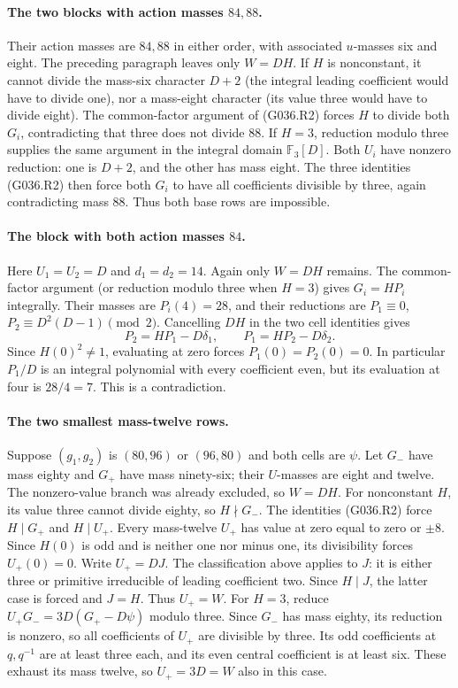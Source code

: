 \paragraph{The two blocks with action masses $84,88$.}
Their action masses are $84,88$ in either order, with associated
$u$-masses six and eight. The preceding paragraph leaves only
$W=DH$. If $H$ is nonconstant, it cannot divide the mass-six
character $D+2$ (the integral leading coefficient would have
to divide one), nor a mass-eight character (its value three
would have to divide eight). The common-factor argument of
(G036.R2) forces $H$ to divide both $G_i$, contradicting that
three does not divide $88$.
If $H=3$, reduction modulo three supplies the same argument
in the integral domain $\mathbb F_3[D]$. Both $U_i$ have
nonzero reduction: one is $D+2$, and the other has mass eight.
The three identities (G036.R2) then force both $G_i$ to have
all coefficients divisible by three, again contradicting
mass $88$. Thus both base rows are impossible.

\paragraph{The block with both action masses $84$.}
Here $U_1=U_2=D$ and $d_1=d_2=14$. Again only $W=DH$
remains. The common-factor argument (or reduction modulo
three when $H=3$) gives $G_i=HP_i$ integrally. Their masses
are $P_i(4)=28$, and their reductions are
$P_1\equiv0$, $P_2\equiv D^2(D-1)\pmod2$.
Cancelling $DH$ in the two cell identities gives
\[
 P_2=HP_1-D\delta_1,\qquad
 P_1=HP_2-D\delta_2.
\]
Since $H(0)^2\ne1$, evaluating at zero forces
$P_1(0)=P_2(0)=0$. In particular $P_1/D$ is an integral
polynomial with every coefficient even, but its evaluation
at four is $28/4=7$. This is a contradiction.

\paragraph{The two smallest mass-twelve rows.}
Suppose $(g_1,g_2)$ is $(80,96)$ or $(96,80)$ and both
cells are $\psi$. Let $G_-$ have mass eighty and $G_+$
have mass ninety-six; their $U$-masses are eight and twelve.
The nonzero-value branch was already excluded, so $W=DH$.
For nonconstant $H$, its value three cannot divide eighty,
so $H\nmid G_-$. The identities (G036.R2) force
$H\mid G_+$ and $H\mid U_+$. Every mass-twelve $U_+$
has value at zero equal to zero or $\pm8$. Since $H(0)$ is
odd and is neither one nor minus one, its divisibility
forces $U_+(0)=0$. Write $U_+=DJ$. The classification above
applies to $J$: it is either three or primitive irreducible
of leading coefficient two. Since $H\mid J$, the latter
case is forced and $J=H$. Thus $U_+=W$.
For $H=3$, reduce $U_+G_-=3D(G_+-D\psi)$ modulo three.
Since $G_-$ has mass eighty, its reduction is nonzero, so
all coefficients of $U_+$ are divisible by three. Its odd
coefficients at $q,q^{-1}$ are at least three each, and its
even central coefficient is at least six. These exhaust its
mass twelve, so $U_+=3D=W$ also in this case.

